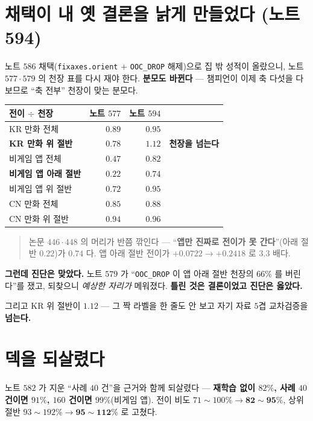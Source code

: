 \documentclass[11pt]{article}
\begin{document}
\section{채택이 내 옛 결론을 낡게 만들었다 (노트 594)}

노트 $586$ 채택(\texttt{fixaxes.orient} $+$ \texttt{OOC\_DROP} 해제)으로
집 밖 성적이 올랐으니, 노트 $577 \cdot 579$ 의 천장 표를 다시 재야 한다.
\textbf{분모도 바뀐다} --- 챔피언이 이제 축 다섯을 다 보므로 ``축 전부''
천장이 맞는 분모다.

\begin{center}
\begin{tabular}{lrrr}
\hline
전이 $\div$ 천장 & 노트 $577$ & \textbf{노트 $594$} & \\
\hline
KR 만화 전체 & $0.89$ & $\mathbf{0.95}$ & \\
\textbf{KR 만화 위 절반} & $0.78$ & $\mathbf{1.12}$ & \textbf{천장을 넘는다} \\
비게임 앱 전체 & $0.47$ & $\mathbf{0.82}$ & \\
\textbf{비게임 앱 아래 절반} & $\mathbf{0.22}$ & $\mathbf{0.74}$ & \\
비게임 앱 위 절반 & $0.72$ & $0.95$ & \\
CN 만화 전체 & $0.85$ & $0.88$ & \\
CN 만화 위 절반 & $0.94$ & $0.96$ & \\
\hline
\end{tabular}
\end{center}

\begin{quote}
논문 $446 \cdot 448$ 의 머리가 반쯤 깎인다 --- ``\textbf{앱만 진짜로
전이가 못 간다}''(아래 절반 $0.22$)가 \textbf{$0.74$} 다. 앱 아래 절반
전이가 $+0.0722 \to \mathbf{+0.2418}$ 로 $3.3$ 배다.
\end{quote}

\textbf{그런데 진단은 맞았다.} 노트 $579$ 가 ``\texttt{OOC\_DROP} 이 앱
아래 절반 천장의 $66\%$ 를 버린다''를 쟀고, 되찾으니 \emph{예상한
자리가} 메워졌다. \textbf{틀린 것은 결론이었고 진단은 옳았다.}

그리고 KR 위 절반이 $\mathbf{1.12}$ --- 그 짝 라벨을 한 줄도 안 보고
자기 자료 $5$겹 교차검증을 \textbf{넘는다.}

\section*{덱을 되살렸다}

노트 $582$ 가 지운 ``사례 $40$ 건''을 근거와 함께 되살렸다 ---
\textbf{재학습 없이 $82\%$, 사례 $40$ 건이면 $91\%$, $160$ 건이면
$99\%$}(비게임 앱). 전이 비도 $71\!\sim\!100\% \to \mathbf{82\!\sim\!95\%}$,
상위 절반 $93\!\sim\!192\% \to \mathbf{95\!\sim\!112\%}$ 로 고쳤다.
\end{document}

